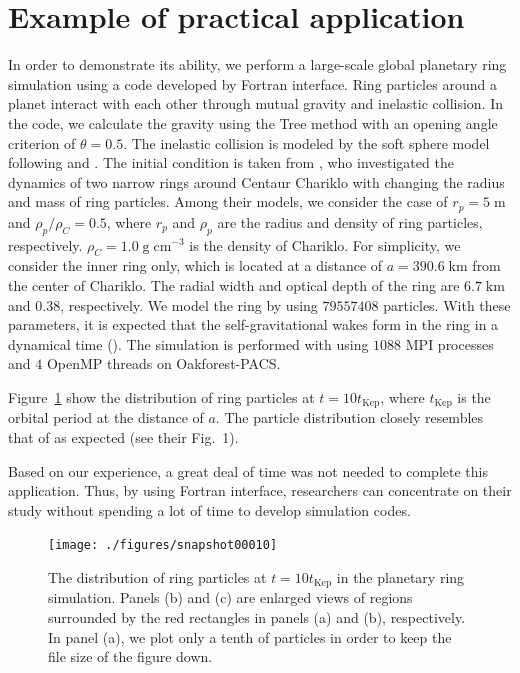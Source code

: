 \documentclass[twocolumn,useamsfonts]{pasj01}
\begin{document}
\section{Example of practical application}
\label{sec:example}
% 
In order to demonstrate its ability, we perform a large-scale global planetary ring simulation using a code developed by Fortran interface. Ring particles around a planet interact with each other through mutual gravity and inelastic collision. In the code, we calculate the gravity using the Tree method with an opening angle criterion of $\theta=0.5$. The inelastic collision is modeled by the soft sphere model following \citet{salo95:simulat_of_dense_planetary} and \citet{michikoshi17a:_simulat_smallest}. The initial condition is taken from \citet{michikoshi17a:_simulat_smallest}, who investigated the dynamics of two narrow rings around Centaur Chariklo with changing the radius and mass of ring particles. Among their models, we consider the case of $r_{p}=5\;\mathrm{m}$ and $\rho_{p}/\rho_{C}=0.5$, where $r_{p}$ and $\rho_{p}$ are the radius and density of ring particles, respectively. $\rho_{C}=1.0\;\mathrm{g\;cm^{-3}}$ is the density of Chariklo. For simplicity, we consider the inner ring only, which is located at a distance of $a=390.6\; \mathrm{km}$ from the center of Chariklo. The radial width and optical depth of the ring are $6.7\;\mathrm{km}$ and $0.38$, respectively.  We model the ring by using $79557408$ particles. With these parameters, it is expected that the self-gravitational wakes form in the ring in a dynamical time (\cite{toomre64:on_the_grav_instab_}). The simulation is performed with using $1088$ MPI processes and $4$ OpenMP threads on Oakforest-PACS.

Figure~\ref{fig:planetary_ring} show the distribution of ring particles at $t=10t_{\mathrm{Kep}}$, where $t_{\mathrm{Kep}}$ is the orbital period at the distance of $a$. The particle distribution closely resembles that of \citet{michikoshi17a:_simulat_smallest} as expected (see their Fig.~1). 

Based on our experience, a great deal of time was not needed to complete this application. Thus, by using Fortran interface, researchers can concentrate on their study without spending a lot of time to develop simulation codes.


\begin{figure}[htbp]
\begin{center}
\texttt{[image: ./figures/snapshot00010]}  
\end{center}
\caption{The distribution of ring particles at $t=10t_{\mathrm{Kep}}$ in the planetary ring simulation. Panels (b) and (c) are enlarged views of regions surrounded by the red rectangles in panels (a) and (b), respectively. In panel (a), we plot only a tenth of particles in order to keep the file size of the figure down.}
\label{fig:planetary_ring}  
\end{figure}
\end{document}
